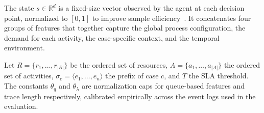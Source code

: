 \documentclass[journal,onecolumn]{IEEEtran}
\begin{document}
The state $s \in \mathbb{R}^{d}$ is a fixed-size vector observed
by the agent at each decision point, normalized to $[0, 1]$ to
improve sample efficiency~\cite{sutton_2018_rl_intro}. It
concatenates four groups of features that together capture the
global process configuration, the demand for each activity, the
case-specific context, and the temporal environment.

Let $R = \{r_1, \dots, r_{|R|}\}$ be the ordered set of
resources, $A = \{a_1, \dots, a_{|A|}\}$ the ordered set of
activities, $\sigma_c = \langle e_1, \dots, e_n \rangle$ the
prefix of case $c$, and $T$ the SLA threshold. The constants
$\theta_q$ and $\theta_\lambda$ are normalization caps for
queue-based features and trace length respectively, calibrated
empirically across the event logs used in the evaluation.
\end{document}
